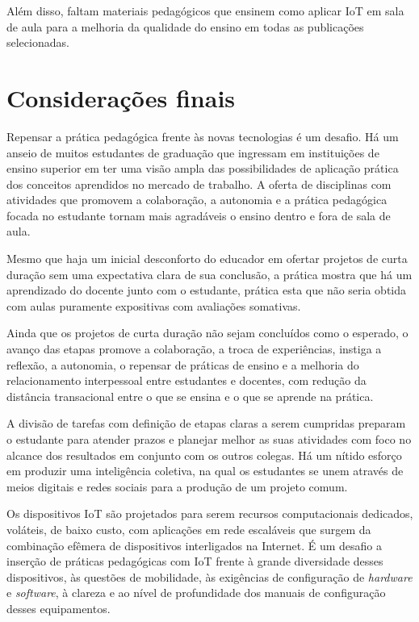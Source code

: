 \documentclass[portuguese]{textolivre}
\begin{document}
Além disso, faltam materiais pedagógicos que ensinem como aplicar IoT em sala de aula para a melhoria da qualidade do ensino em todas as publicações selecionadas.


\section{Considerações finais}\label{sec-modelo}
Repensar a prática pedagógica frente às novas tecnologias é um desafio. Há um anseio de muitos estudantes de graduação que ingressam em instituições de ensino superior em ter uma visão ampla das possibilidades de aplicação prática dos conceitos aprendidos no mercado de trabalho. A oferta de disciplinas com atividades que promovem a colaboração, a autonomia e a prática pedagógica focada no estudante tornam mais agradáveis o ensino dentro e fora de sala de aula. 

Mesmo que haja um inicial desconforto do educador em ofertar projetos de curta duração sem uma expectativa clara de sua conclusão, a prática mostra que há um aprendizado do docente junto com o estudante, prática esta que não seria obtida com aulas puramente expositivas com avaliações somativas. 

Ainda que os projetos de curta duração não sejam concluídos como o esperado, o avanço das etapas promove a colaboração, a troca de experiências, instiga a reflexão, a autonomia, o repensar de práticas de ensino e a melhoria do relacionamento interpessoal entre estudantes e docentes, com redução da distância transacional entre o que se ensina e o que se aprende na prática. 

A divisão de tarefas com definição de etapas claras a serem cumpridas preparam o estudante para atender prazos e planejar melhor as suas atividades com foco no alcance dos resultados em conjunto com os outros colegas. Há um nítido esforço em produzir uma inteligência coletiva, na qual os estudantes se unem através de meios digitais e redes sociais para a produção de um projeto comum.

Os dispositivos IoT são projetados para serem recursos computacionais dedicados, voláteis, de baixo custo, com aplicações em rede escaláveis que surgem da combinação efêmera de dispositivos interligados na Internet. É um desafio a inserção de práticas pedagógicas com IoT frente à grande diversidade desses dispositivos, às questões de mobilidade, às exigências de configuração de \textit{hardware} e \textit{software}, à clareza e ao nível de profundidade dos manuais de configuração desses equipamentos. 
\end{document}
